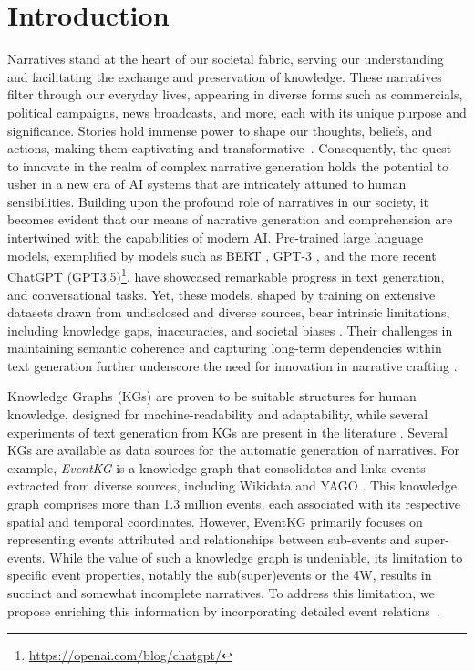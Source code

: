 \documentclass[
hf, %
]{ceurart}
\begin{document}
\section{Introduction}
\label{sec:introduction}
Narratives stand at the heart of our societal fabric, serving our understanding and facilitating the exchange and preservation of knowledge. These narratives filter through our everyday lives, appearing in diverse forms such as commercials, political campaigns, news broadcasts, and more, each with its unique purpose and significance. 
Stories hold immense power to shape our thoughts, beliefs, and actions, making them captivating and transformative~\cite{green2004understanding}. Consequently, the quest to innovate in the realm of complex narrative generation holds the potential to usher in a new era of AI systems that are intricately attuned to human sensibilities. Building upon the profound role of narratives in our society, it becomes evident that our means of narrative generation and comprehension are intertwined with the capabilities of modern AI. Pre-trained large language models, exemplified by models such as BERT \cite{BERT}, GPT-3 \cite{GPT-3}, and the more recent ChatGPT (GPT3.5)\footnote{\url{https://openai.com/blog/chatgpt/}}, have showcased remarkable progress in text generation, and conversational tasks. Yet, these models, shaped by training on extensive datasets drawn from undisclosed and diverse sources, bear intrinsic limitations, including knowledge gaps, inaccuracies, and societal biases \cite{GPT-3,documenting_corpora}. Their challenges in maintaining semantic coherence and capturing long-term dependencies within text generation further underscore the need for innovation in narrative crafting \cite{PLM_survey,semantic_coherence}. 

Knowledge Graphs (KGs) are proven to be suitable structures for human knowledge, designed for machine-readability and adaptability, while several experiments of text generation from KGs are present in the literature \cite{KG_survey}. Several KGs are available as data sources for the automatic generation of narratives. For example, \textit{EventKG} \cite{gottschalk2019eventkg} is a knowledge graph that consolidates and links events extracted from diverse sources, including Wikidata and YAGO \cite{hoffart2013yago2}. This knowledge graph comprises more than 1.3 million events, each associated with its respective spatial and temporal coordinates. However, EventKG primarily focuses on representing events attributed and relationships between sub-events and super-events. While the value of such a knowledge graph is undeniable, its limitation to specific event properties, notably the sub(super)events or the 4W, results in succinct and somewhat incomplete narratives. To address this limitation, we propose enriching this information by incorporating detailed event relations~\cite{beyond_causality}.
\end{document}
